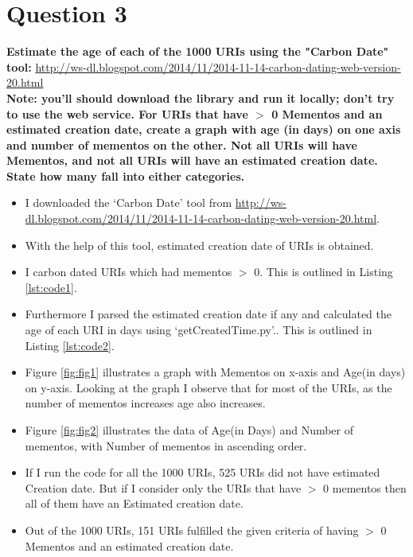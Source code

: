 \chapter{Question 3}
\label{available-representation}

\textbf{Estimate the age of each of the 1000 URIs using the "Carbon Date" tool: }
\url{http://ws-dl.blogspot.com/2014/11/2014-11-14-carbon-dating-web-version-20.html}\\

\textbf{Note: you'll should download the library and run it locally; don't try to use the web service.
For URIs that have $>$ 0 Mementos and an estimated creation date, create a graph with age (in days) on one axis and number of mementos
on the other.  
Not all URIs will have Mementos, and not all URIs will have an estimated creation date.  State how many fall into either categories. }

\begin{itemize}
\item I downloaded the `Carbon Date' tool from {\url{http://ws-dl.blogspot.com/2014/11/2014-11-14-carbon-dating-web-version-20.html}}. 
\item With the help of this tool, estimated creation date of URIs is obtained.
\item I carbon dated URIs which had mementos $>$ 0. This is outlined in Listing \ref{lst:code1}.
\item Furthermore I parsed the estimated creation date if any and calculated the age of each URI in days using `getCreatedTime.py'.. This is outlined in Listing \ref{lst:code2}.
\item Figure \ref{fig:fig1} illustrates a graph with Mementos on x-axis and Age(in days) on y-axis. Looking at the graph I observe that for most of the URIs, as the number of mementos increases age also increases.
\item Figure \ref{fig:fig2} illustrates the data of Age(in Days) and Number of mementos, with Number of mementos in ascending order. 
\item If I run the code for all the 1000 URIs, 525 URIs did not have estimated Creation date. But if I consider only the URIs that have $>$ 0 mementos then all of them have an Estimated creation date.
\item Out of the  1000 URIs, 151 URIs fulfilled the given criteria of having $>$ 0 Mementos and an estimated creation date. 
\end{itemize}

